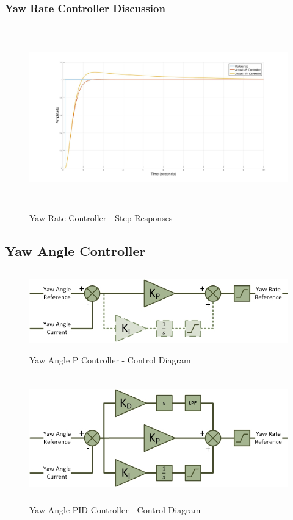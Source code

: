 		\subsubsection{Yaw Rate Controller Discussion}
		\begin{figure}[H]
			\centering
			\includegraphics[height = 8cm]{../Design/Matlab/Controllers/yaw_rate_step.jpg}
			\caption{Yaw Rate Controller -  Step Responses}
			\label{IM_YawRateStep}
		\end{figure}
		
		
		\subsection{Yaw Angle Controller}	
		
		\begin{figure}[H]
			\centering
			\includegraphics[height = 3.5cm]{../References/Diagrams/YawAngleController.jpg}
			\caption{Yaw Angle P Controller -  Control Diagram}
			\label{IM_YawAngleController}
		\end{figure}

		\begin{figure}[H]
			\centering
			\includegraphics[height = 5.5cm]{../References/Diagrams/YawAngleControllerPID.jpg}
			\caption{Yaw Angle PID Controller -  Control Diagram}
			\label{IM_YawAngleControllerPID}
		\end{figure}
				
